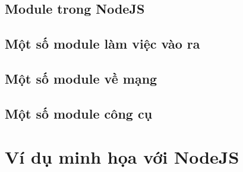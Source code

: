 \documentclass[a4paper,12pt]{report}
\begin{document}
\section{Module trong NodeJS}
\section{Một số module làm việc vào ra}
\section{Một số module về mạng}
\section{Một số module công cụ}

\chapter{Ví dụ minh họa với NodeJS}





\end{document}
